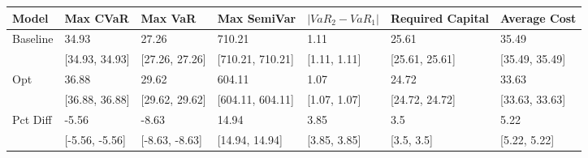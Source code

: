 \begin{tabular}{lllllll}
\toprule
   Model &       Max CVaR &        Max VaR &      Max SemiVar & $|VaR_2 - VaR_1|$ & Required Capital &   Average Cost \\
\midrule
Baseline &          34.93 &          27.26 &           710.21 &              1.11 &            25.61 &          35.49 \\
         & [34.93, 34.93] & [27.26, 27.26] & [710.21, 710.21] &      [1.11, 1.11] &   [25.61, 25.61] & [35.49, 35.49] \\
     Opt &          36.88 &          29.62 &           604.11 &              1.07 &            24.72 &          33.63 \\
         & [36.88, 36.88] & [29.62, 29.62] & [604.11, 604.11] &      [1.07, 1.07] &   [24.72, 24.72] & [33.63, 33.63] \\
Pct Diff &          -5.56 &          -8.63 &            14.94 &              3.85 &              3.5 &           5.22 \\
         & [-5.56, -5.56] & [-8.63, -8.63] &   [14.94, 14.94] &      [3.85, 3.85] &       [3.5, 3.5] &   [5.22, 5.22] \\
\bottomrule
\end{tabular}
